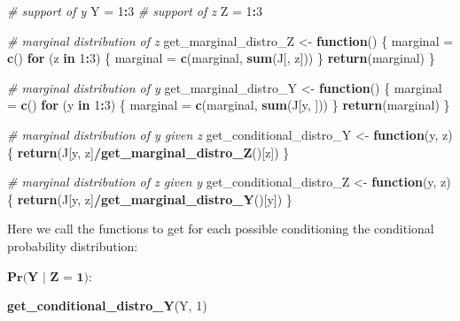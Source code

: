 \documentclass[
]{article}
\newenvironment{Shaded}{\begin{snugshade}}{\end{snugshade}}
\newcommand{\CommentTok}[1]{\textcolor[rgb]{0.56,0.35,0.01}{\textit{#1}}}
\newcommand{\ControlFlowTok}[1]{\textcolor[rgb]{0.13,0.29,0.53}{\textbf{#1}}}
\newcommand{\DecValTok}[1]{\textcolor[rgb]{0.00,0.00,0.81}{#1}}
\newcommand{\FunctionTok}[1]{\textcolor[rgb]{0.13,0.29,0.53}{\textbf{#1}}}
\newcommand{\NormalTok}[1]{#1}
\newcommand{\OtherTok}[1]{\textcolor[rgb]{0.56,0.35,0.01}{#1}}
\newcommand{\SpecialCharTok}[1]{\textcolor[rgb]{0.81,0.36,0.00}{\textbf{#1}}}
\begin{document}
\begin{Shaded}
\begin{Highlighting}[]
\CommentTok{\# support of y}
\NormalTok{Y }\OtherTok{=} \DecValTok{1}\SpecialCharTok{:}\DecValTok{3}
\CommentTok{\# support of z}
\NormalTok{Z }\OtherTok{=} \DecValTok{1}\SpecialCharTok{:}\DecValTok{3}

\CommentTok{\# marginal distribution of z}
\NormalTok{get\_marginal\_distro\_Z }\OtherTok{\textless{}{-}} \ControlFlowTok{function}\NormalTok{() \{}
\NormalTok{    marginal }\OtherTok{=} \FunctionTok{c}\NormalTok{()}
    \ControlFlowTok{for}\NormalTok{ (z }\ControlFlowTok{in} \DecValTok{1}\SpecialCharTok{:}\DecValTok{3}\NormalTok{) \{}
\NormalTok{        marginal }\OtherTok{=} \FunctionTok{c}\NormalTok{(marginal, }\FunctionTok{sum}\NormalTok{(J[, z]))}
\NormalTok{    \}}
    \FunctionTok{return}\NormalTok{(marginal)}
\NormalTok{\}}

\CommentTok{\# marginal distribution of y}
\NormalTok{get\_marginal\_distro\_Y }\OtherTok{\textless{}{-}} \ControlFlowTok{function}\NormalTok{() \{}
\NormalTok{    marginal }\OtherTok{=} \FunctionTok{c}\NormalTok{()}
    \ControlFlowTok{for}\NormalTok{ (y }\ControlFlowTok{in} \DecValTok{1}\SpecialCharTok{:}\DecValTok{3}\NormalTok{) \{}
\NormalTok{        marginal }\OtherTok{=} \FunctionTok{c}\NormalTok{(marginal, }\FunctionTok{sum}\NormalTok{(J[y, ]))}
\NormalTok{    \}}
    \FunctionTok{return}\NormalTok{(marginal)}
\NormalTok{\}}

\CommentTok{\# marginal distribution of y given z}
\NormalTok{get\_conditional\_distro\_Y }\OtherTok{\textless{}{-}} \ControlFlowTok{function}\NormalTok{(y, z) \{}
    \FunctionTok{return}\NormalTok{(J[y, z]}\SpecialCharTok{/}\FunctionTok{get\_marginal\_distro\_Z}\NormalTok{()[z])}
\NormalTok{\}}

\CommentTok{\# marginal distribution of z given y}
\NormalTok{get\_conditional\_distro\_Z }\OtherTok{\textless{}{-}} \ControlFlowTok{function}\NormalTok{(y, z) \{}
    \FunctionTok{return}\NormalTok{(J[y, z]}\SpecialCharTok{/}\FunctionTok{get\_marginal\_distro\_Y}\NormalTok{()[y])}
\NormalTok{\}}
\end{Highlighting}
\end{Shaded}

Here we call the functions to get for each possible conditioning the
conditional probability distribution:

\(\textbf{Pr(Y | Z = 1)}\):

\begin{Shaded}
\begin{Highlighting}[]
\FunctionTok{get\_conditional\_distro\_Y}\NormalTok{(Y, }\DecValTok{1}\NormalTok{)}
\end{Highlighting}
\end{Shaded}
\end{document}
